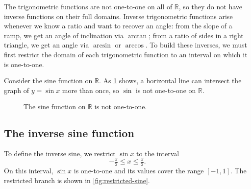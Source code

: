 The trigonometric functions are not one-to-one on all of \(\mathbb{R}\), so they do not have inverse functions on their full domains. Inverse trigonometric functions arise whenever we know a ratio and want to recover an angle: from the slope of a ramp, we get an angle of inclination via \(\arctan\); from a ratio of sides in a right triangle, we get an angle via \(\arcsin\) or \(\arccos\). To build these inverses, we must first restrict the domain of each trigonometric function to an interval on which it is one-to-one.

Consider the sine function on \(\mathbb{R}\). As \cref{fig:sine-not-one-to-one} shows, a horizontal line can intersect the graph of \(y = \sin x\) more than once, so \(\sin\) is not one-to-one on \(\mathbb{R}\).

\begin{figure}[H]
\centering
{}
\caption{The sine function on \(\mathbb{R}\) is not one-to-one.}
\label{fig:sine-not-one-to-one}
\end{figure}

\subsection{The inverse sine function}

To define the inverse sine, we restrict \(\sin x\) to the interval
\[
-\tfrac{\pi}{2} \le x \le \tfrac{\pi}{2}.
\]
On this interval, \(\sin x\) is one-to-one and its values cover the range \([-1, 1]\). The restricted branch is shown in \cref{fig:restricted-sine}.

